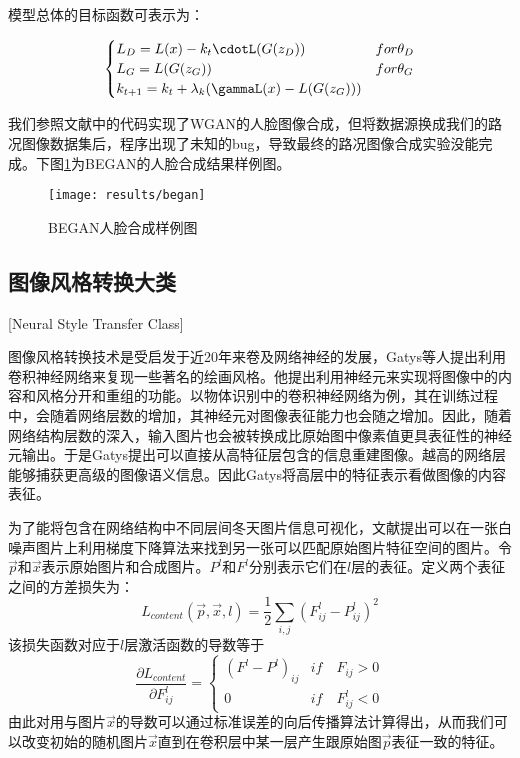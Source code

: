 模型总体的目标函数可表示为：

$$
\begin{cases}
    L_D = L(x) - k_t\cdotL(G(z_D)) & for \theta_D \\
    L_G = L(G(z_G)) & for \theta_G \\
    k_{t+1} = k_t + \lambda_k(\gammaL(x)-L(G(z_G))) 
\end{cases}
$$

我们参照文献中的代码实现了WGAN的人脸图像合成，但将数据源换成我们的路况图像数据集后，程序出现了未知的bug，导致最终的路况图像合成实验没能完成。下图\ref{fig:began}为BEGAN的人脸合成结果样例图。

\begin{figure}[h]
    \centering
    \texttt{[image: results/began]}
    \caption{BEGAN人脸合成样例图}
    \label{fig:began}
\end{figure}


\subsection{图像风格转换大类}[Neural Style Transfer Class]

图像风格转换技术是受启发于近20年来卷及网络神经的发展，Gatys等人\cite{nst}提出利用卷积神经网络来复现一些著名的绘画风格。他提出利用神经元来实现将图像中的内容和风格分开和重组的功能。以物体识别中的卷积神经网络为例，其在训练过程中，会随着网络层数的增加，其神经元对图像表征能力也会随之增加。因此，随着网络结构层数的深入，输入图片也会被转换成比原始图中像素值更具表征性的神经元输出。于是Gatys提出可以直接从高特征层包含的信息重建图像。越高的网络层能够捕获更高级的图像语义信息。因此Gatys将高层中的特征表示看做图像的内容表征。

为了能将包含在网络结构中不同层间冬天图片信息可视化，文献\cite{nst}提出可以在一张白噪声图片上利用梯度下降算法来找到另一张可以匹配原始图片特征空间的图片。令$\overrightarrow{p}$和$\overrightarrow{x}$表示原始图片和合成图片。$P^l$和$F^l$分别表示它们在$l$层的表征。定义两个表征之间的方差损失为：
$$L_{content}(\overrightarrow{p},\overrightarrow{x},l)=\frac{1}{2}\sum_{i,j}(F_{ij}^l-P_{ij}^l)^2$$
该损失函数对应于$l$层激活函数的导数等于
$$\frac{\partial L_{content}}{\partial F_{ij}^l} = \begin{cases}
    (F^l-P^l)_{ij}  & if \quad F_{ij} > 0 \\
    0 & if \quad F_{ij}^l \lt 0
\end{cases}$$
由此对用与图片$\vec{x}$的导数可以通过标准误差的向后传播算法计算得出，从而我们可以改变初始的随机图片$\vec{x}$直到在卷积层中某一层产生跟原始图$\vec{p}$表征一致的特征。

